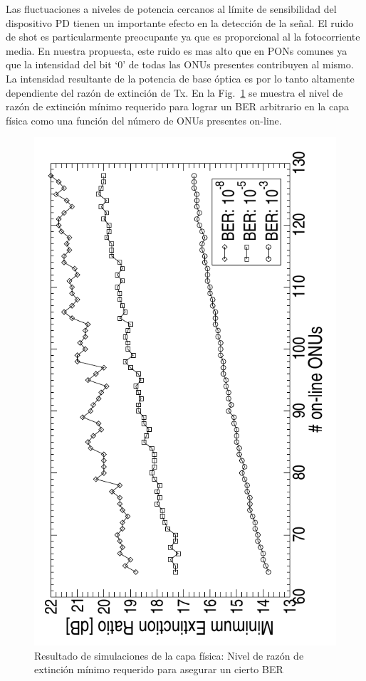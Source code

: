Las fluctuaciones a niveles de potencia cercanos al límite de sensibilidad del dispositivo PD tienen un importante efecto en la detección de la señal.
El ruido de shot es particularmente preocupante ya que es proporcional al la fotocorriente media. En nuestra propuesta, este ruido es mas alto que en PONs comunes ya que la intensidad del bit `0' de todas las ONUs presentes contribuyen al mismo.
La intensidad resultante de la potencia de base óptica es por lo tanto altamente dependiente del razón de extinción de Tx.
En la Fig.~\ref{sim:optical} se muestra el nivel de razón de extinción mínimo requerido para lograr un BER arbitrario en la capa física como una función del número de ONUs presentes on-line.
\begin{figure}[!t]
    \centering
      \includegraphics[angle= 270, width=3.5 in]{graphs/orte03.pdf}
      \caption{Resultado de simulaciones de la capa física: Nivel de razón de extinción mínimo requerido para asegurar un cierto BER}
      \label{sim:optical}
\end{figure}
